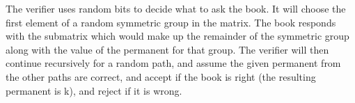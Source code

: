 \documentclass{article}
\begin{document}
The verifier uses random bits to decide what to ask the book.  It will choose the first element of a random symmetric group in the matrix.  The book responds with the submatrix which would make up the remainder of the symmetric group along with the value of the permanent for that group. The verifier will then continue recursively for a random path, and assume the given permanent from the other paths are correct, and accept if the book is right (the resulting permanent is k), and reject if it is wrong.
\end{document}
